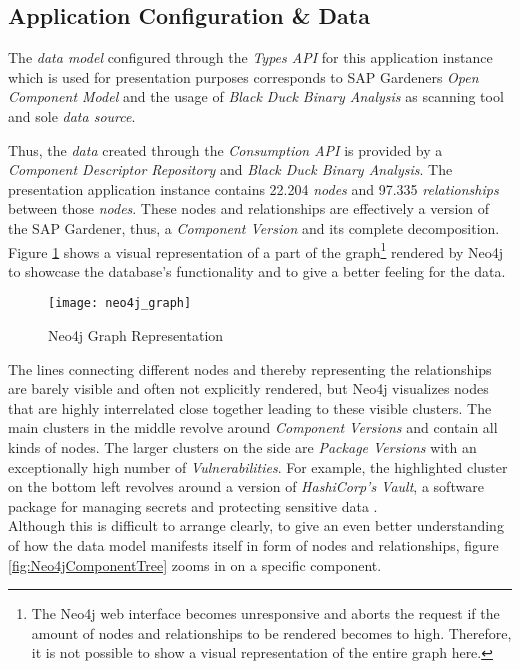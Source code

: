 \subsection{Application Configuration \& Data}
The \emph{data model} configured through the \emph{Types API} for this application instance which is used for presentation purposes corresponds to SAP Gardeners \emph{Open Component Model} and the usage of \emph{Black Duck Binary Analysis} as scanning tool and sole \emph{data source}.\par
Thus, the \emph{data} created through the \emph{Consumption API} is provided by a \emph{Component Descriptor Repository} and \emph{Black Duck Binary Analysis}. The presentation application instance contains 22.204 \emph{nodes} and 97.335 \emph{relationships} between those \emph{nodes}. These nodes and relationships are effectively a version of the SAP Gardener, thus, a \emph{Component Version} and its complete decomposition. Figure \ref{fig:Neo4jGraph} shows a visual representation of a part of the graph\footnote{The Neo4j web interface becomes unresponsive and aborts the request if the amount of nodes and relationships to be rendered becomes to high. Therefore, it is not possible to show a visual representation of the entire graph here.} rendered by Neo4j to showcase the database's functionality and to give a better feeling for the data.\par

\begin{figure}[H]
	\centering
	\texttt{[image: neo4j\_graph]}
	\caption[Neo4j Graph]{Neo4j Graph Representation }
	\label{fig:Neo4jGraph}
\end{figure}

The lines connecting different nodes and thereby representing the relationships are barely visible and often not explicitly rendered, but Neo4j visualizes nodes that are highly interrelated close together leading to these visible clusters. The main clusters in the middle revolve around \emph{Component Versions} and contain all kinds of nodes. The larger clusters on the side are \emph{Package Versions} with an exceptionally high number of \emph{Vulnerabilities}. For example, the highlighted cluster on the bottom left revolves around a version of \emph{HashiCorp's Vault}, a software package for managing secrets and protecting sensitive data \cite{vault}.\\

Although this is difficult to arrange clearly, to give an even better understanding of how the data model manifests itself in form of nodes and relationships, figure \ref{fig:Neo4jComponentTree} zooms in on a specific component.

